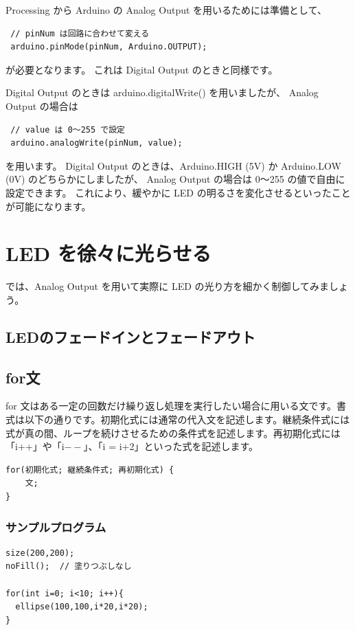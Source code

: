 \documentclass[11pt,a4paper]{jarticle}
\begin{document}
\newpage

Processing から Arduino の Analog Output を用いるためには準備として、
\begin{lstlisting}
 // pinNum は回路に合わせて変える 
 arduino.pinMode(pinNum, Arduino.OUTPUT);
\end{lstlisting}
が必要となります。
これは Digital Output のときと同様です。

Digital Output のときは arduino.digitalWrite() を用いましたが、
Analog Output の場合は
\begin{lstlisting}
 // value は 0〜255 で設定
 arduino.analogWrite(pinNum, value);
\end{lstlisting}
を用います。
Digital Output のときは、Arduino.HIGH (5V) か Arduino.LOW (0V) のどちらかにしましたが、
Analog Output の場合は 0〜255 の値で自由に設定できます。
これにより、緩やかに LED の明るさを変化させるといったことが可能になります。

\section{LED を徐々に光らせる}
では、Analog Output を用いて実際に LED の光り方を細かく制御してみましょう。

\subsection{LEDのフェードインとフェードアウト}
\label{subsection:LEDfade-inAndFade-out}

\subsection*{for文}
for 文はある一定の回数だけ繰り返し処理を実行したい場合に用いる文です。書式は以下の通りです。初期化式には通常の代入文を記述します。継続条件式には式が真の間、ループを続けさせるための条件式を記述します。再初期化式には「i++」や「i$--$」、「i = i+2」といった式を記述します。

\begin{lstlisting}
for(初期化式; 継続条件式; 再初期化式) {
	文;
}
\end{lstlisting}

\subsubsection*{サンプルプログラム}
\begin{lstlisting}
size(200,200);
noFill();  // 塗りつぶしなし

for(int i=0; i<10; i++){
  ellipse(100,100,i*20,i*20);
}
\end{lstlisting}
\end{document}
